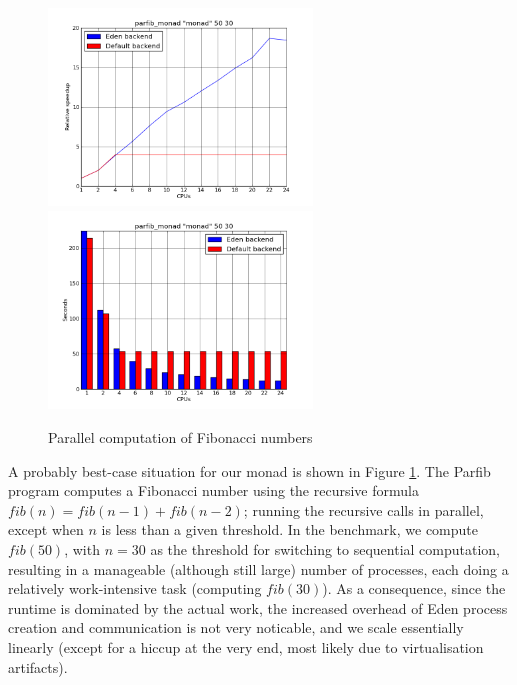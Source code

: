 \documentclass[a4paper, oneside, final]{article}
\begin{document}
\begin{figure}
\caption{Parallel computation of Fibonacci numbers}
\label{fig:parfib}
\includegraphics[width=7cm]{parfib_monad-speedup.png}
\includegraphics[width=7cm]{parfib_monad-runtimes.png}
\end{figure}

A probably best-case situation for our monad is shown in Figure
\ref{fig:parfib}.  The Parfib program computes a Fibonacci number
using the recursive formula $fib(n) = fib(n-1) + fib(n-2)$; running
the recursive calls in parallel, except when $n$ is less than a given
threshold.  In the benchmark, we compute $fib(50)$, with $n=30$ as the
threshold for switching to sequential computation, resulting in a
manageable (although still large) number of processes, each doing a
relatively work-intensive task (computing $fib(30)$).  As a
consequence, since the runtime is dominated by the actual work, the
increased overhead of Eden process creation and communication is not
very noticable, and we scale essentially linearly (except for a hiccup
at the very end, most likely due to virtualisation artifacts).
\end{document}
